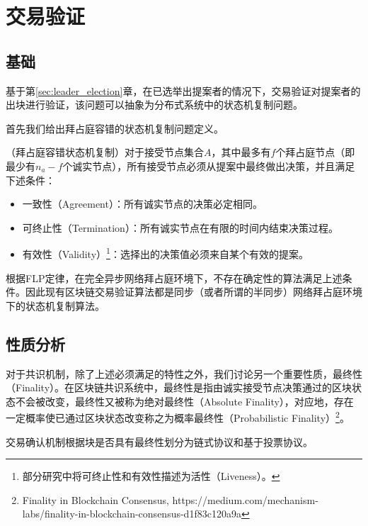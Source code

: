 \section{交易验证}
\label{sec:tx_verification}
\subsection{基础}
基于第\ref{sec:leader_election}章，在已选举出提案者的情况下，交易验证对提案者的出块进行验证，该问题可以抽象为分布式系统中的状态机复制问题\cite{pass2017rethinking}。



首先我们给出拜占庭容错的状态机复制问题定义。
\begin{definition}
（拜占庭容错状态机复制）对于接受节点集合$A$，其中最多有$f$个拜占庭节点（即最少有$n_a-f$个诚实节点），所有接受节点必须从提案中最终做出决策，并且满足下述条件：
\begin{itemize}
	\item 一致性（Agreement）：所有诚实节点的决策必定相同。
	\item 可终止性（Termination）：所有诚实节点在有限的时间内结束决策过程。
	\item 有效性（Validity）\footnote{部分研究中将可终止性和有效性描述为活性（Liveness）。}：选择出的决策值必须来自某个有效的提案。
\end{itemize}
\end{definition}

根据FLP定律，在完全异步网络拜占庭环境下，不存在确定性的算法满足上述条件\cite{fischer1982impossibility}。因此现有区块链交易验证算法都是同步（或者所谓的半同步）网络拜占庭环境下的状态机复制算法\cite{gilad2017algorand,castro1999practical}。

\subsection{性质分析}
对于共识机制，除了上述必须满足的特性之外，我们讨论另一个重要性质，最终性（Finality）。在区块链共识系统中，最终性是指由诚实接受节点决策通过的区块状态不会被改变，最终性又被称为绝对最终性（Absolute Finality），对应地，存在一定概率使已通过区块状态改变称之为概率最终性（Probabilistic Finality）\footnote{Finality in Blockchain Consensus, https://medium.com/mechanism-labs/finality-in-blockchain-consensus-d1f83c120a9a}。

交易确认机制根据块是否具有最终性划分为链式协议和基于投票协议\cite{wang2019survey}。

